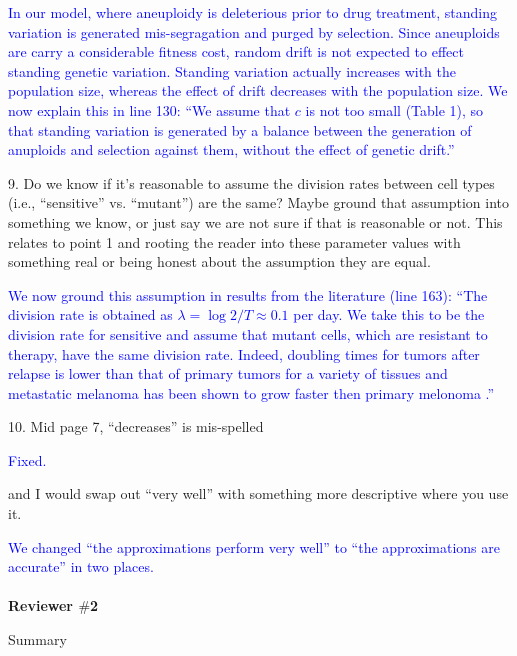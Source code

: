 \documentclass[12pt]{extarticle}
\begin{document}
\textcolor{blue}{In our model, where aneuploidy is deleterious prior to drug treatment, standing variation is generated mis-segragation and purged by selection. Since aneuploids are carry a considerable fitness cost, random drift is not expected to effect standing genetic variation. Standing variation actually increases with the population size, whereas the effect of drift decreases with the population size. We now explain this in line 130: ``We assume that $c$ is not too small (Table 1), so that standing variation is generated by a balance between the generation of anuploids and selection against them, without the effect of genetic drift.''
} 

9. Do we know if it's reasonable to assume the division rates between cell types (i.e., ``sensitive'' vs. ``mutant'') are the same? Maybe ground that assumption into something we know, or just say we are not sure if that is reasonable or not. This relates to point 1 and rooting the reader into these parameter values with something real or being honest about the assumption they are equal.

\textcolor{blue}{ %
We now ground this assumption in results from the literature (line 163): ``The division rate is obtained as $\lambda=\log{2} / T \approx 0.1$ per day. We take this to be the division rate for sensitive and assume that mutant cells, which are resistant to therapy, have the same division rate. Indeed, doubling times for tumors after relapse is lower than that of primary tumors for a variety of tissues \citep{tezuka2007growth,rodgers2024glioblastoma} and metastatic melanoma has been shown to grow faster then primary melonoma \citep{carlson2003tumor}.''
} 

10. Mid page 7, ``decreases'' is mis-spelled 

\textcolor{blue}{%
Fixed. 
} 

and I would swap out ``very well'' with something more descriptive where you use it.

\textcolor{blue}{
We changed ``the approximations perform very well'' to ``the approximations are accurate'' in two places.
} 
\\
\\
\textbf{Reviewer $\#$2}

Summary

\end{document}
